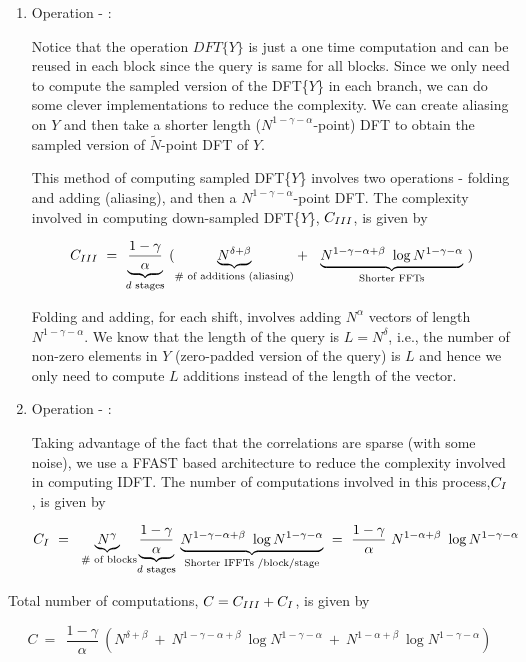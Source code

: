 \begin{enumerate}
	\item  Operation - : 
	
	Notice that the operation $ DFT \{ Y \} $ is just a one time computation and can be reused in each block since the query is same for all blocks.
	Since we only need to compute the sampled version of the DFT\{$Y$\} in each branch, we can do some clever implementations to reduce the complexity. We can create aliasing on $Y$ and then take a shorter length ($N^{1-\gamma-\alpha}$-point) DFT to obtain the sampled version of $\tilde{N}$-point DFT of $Y$.
	
	This method of computing sampled DFT\{$Y$\} involves two operations - folding and adding (aliasing), and then a $N^{1-\gamma-\alpha}$-point DFT. The complexity involved in computing down-sampled DFT\{$Y$\}, $C_{\RNum{3}}$, is given by
	
	 \[ C_{\RNum{3}} \ = \  \underset{\text{$d$ stages} }{\underbrace{\frac{1-\gamma}{\alpha}}} \
	  ( \underset{\text{\# of additions (aliasing)} }{\underbrace{N^{\delta+\beta}}} + \ \
	  \underset{\text{Shorter FFTs} }{\underbrace{N^{1-\gamma-\alpha+\beta} \ \log N^{1-\gamma-\alpha}}} \ )  
	 \]
	
	Folding and adding, for each shift, involves adding $N^{\alpha}$ vectors of length $N^{1-\gamma-\alpha}$. We know that the length of the query is $L =N^{\delta}$, i.e., the number of non-zero elements in $Y$ (zero-padded version of the query) is $L$ and hence we only need to compute $L$ additions instead of the length of the vector.
	
	\item  Operation - \RNum{1}:
	
	Taking advantage of the fact that the correlations are sparse (with some noise), we use a FFAST based architecture to reduce the complexity involved in computing IDFT. The number of computations involved in this process,$C_{\RNum{1}}$, is given by
	
	 \[C_{\RNum{1}} \ = \ \underset{\text{ \# of blocks} }{\underbrace{N^{\gamma}}} \underset{\text{$d$ stages} }{\underbrace{\frac{1-\gamma}{\alpha}}} \
	 \underset{\text{Shorter IFFTs /block/stage} }{\underbrace{N^{1-\gamma-\alpha+\beta} \ \log N^{1-\gamma-\alpha}}} 
	 \ = \  \frac{1-\gamma}{\alpha} \ N^{1-\alpha+\beta} \ \log N^{1-\gamma-\alpha} 
	 \]    
\end{enumerate}

Total number of computations, $C = C_{\RNum{3}}+C_{\RNum{1}} $, is given by

  \[ C \ = \ \  \frac{1-\gamma}{\alpha} \ ( N^{\delta+\beta} \ + \ N^{1-\gamma-\alpha+\beta} \ \log N^{1-\gamma-\alpha} \ + \ N^{1-\alpha+\beta} \ \log N^{1-\gamma-\alpha})
  \]

